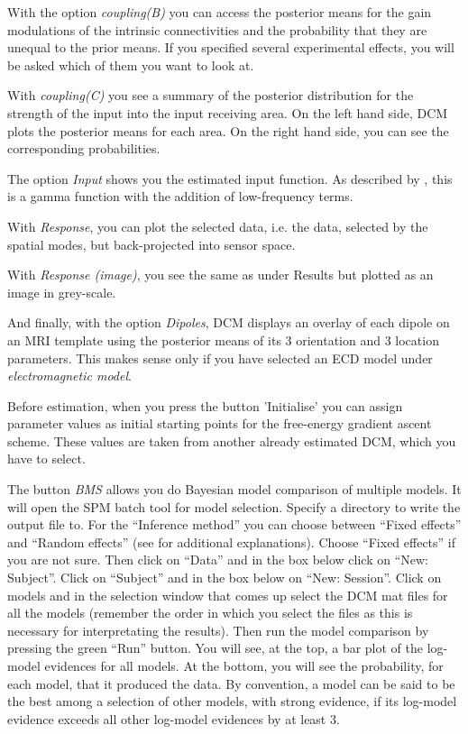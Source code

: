 With the option \textit{coupling(B)} you can access the posterior
means for the gain modulations of the intrinsic connectivities and
the probability that they are unequal to the prior means. If you specified several experimental effects, you will be asked which of them you want to look at.

With \textit{coupling(C)} you see a summary of the posterior
distribution for the strength of the input into the input receiving
area. On the left hand side, DCM plots the posterior means for each
area. On the right hand side, you can see the corresponding
probabilities.


The option \textit{Input} shows you the estimated input function. As
described by \cite{od_dcm_erp}, this is a gamma function with the
addition of low-frequency terms.

With \textit{Response}, you can plot the selected data, i.e. the data,
selected by the spatial modes, but back-projected into sensor space.

With \textit{Response (image)}, you see the same as under Results but
plotted as an image in grey-scale.

And finally, with the option \textit{Dipoles}, DCM displays an
overlay of each dipole on an MRI template using the posterior means of
its 3 orientation and 3 location parameters. This makes sense only if
you have selected an ECD model under \textit{electromagnetic model}.

Before estimation, when you press the button 'Initialise' you can
assign parameter values as initial starting points for the free-energy
gradient ascent scheme. These values are taken from another already
estimated DCM, which you have to select.

The button \textit{BMS} allows you do Bayesian model comparison of
multiple models. It will open the SPM batch tool for model selection. Specify a directory to write the output file to.  For the ``Inference method'' you can choose between ``Fixed effects'' and ``Random effects'' (see \cite{klaas_bms} for additional explanations). Choose ``Fixed effects'' if you are not sure. Then click on ``Data'' and in the box below click on ``New: Subject''. Click on ``Subject'' and in the box below on ``New: Session''. Click on models and in the selection window that comes up select the DCM mat files for all the models (remember the order in which you select the files as this is necessary for interpretating the results). Then run the model comparison by pressing the green ``Run'' button. You will see, at the top, a bar plot of the log-model evidences for all models. At the bottom, you will see the probability, for each model, that it produced the data. By convention, a model can be said to be the best among a selection of other models, with strong evidence, if its log-model evidence exceeds all other log-model evidences by at least 3.

